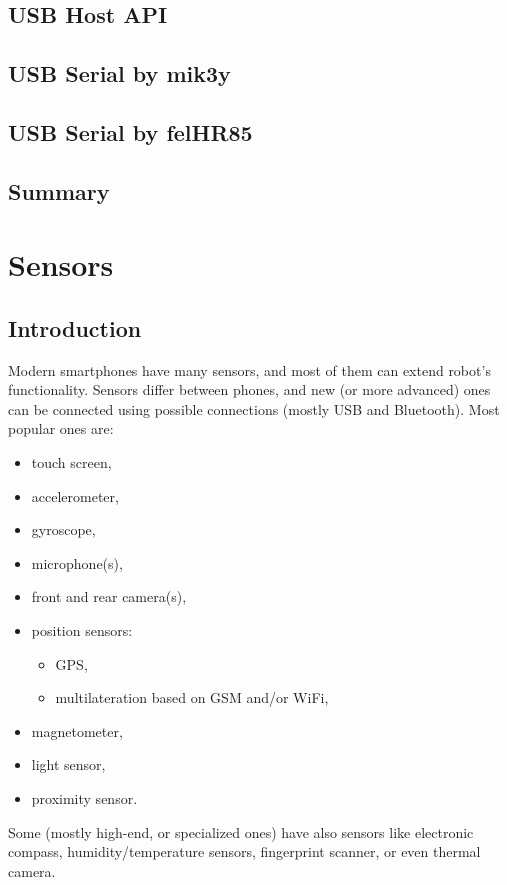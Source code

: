\documentclass[openany]{mgr} %
\begin{document}
\section{USB Host API}
\section{USB Serial by mik3y}
\section{USB Serial by felHR85}

\section{Summary}

\chapter{Sensors}

\section{Introduction}
Modern smartphones have many sensors, and most of them can extend robot's
functionality. Sensors differ between phones, and new (or more advanced) ones can
be connected using possible connections (mostly USB and Bluetooth).
Most popular ones are:
\begin{itemize}
  \item touch screen,
  \item accelerometer,
  \item gyroscope,
  \item microphone(s),
  \item front and rear camera(s),
  \item position sensors:
  \begin{itemize}
    \item GPS,
    \item multilateration based on GSM and/or WiFi,
  \end{itemize}
  \item magnetometer,
  \item light sensor,
  \item proximity sensor.
\end{itemize}
Some (mostly high-end, or specialized ones) have also sensors like electronic
compass, humidity/temperature sensors, fingerprint scanner, or even thermal
camera.
\end{document}
